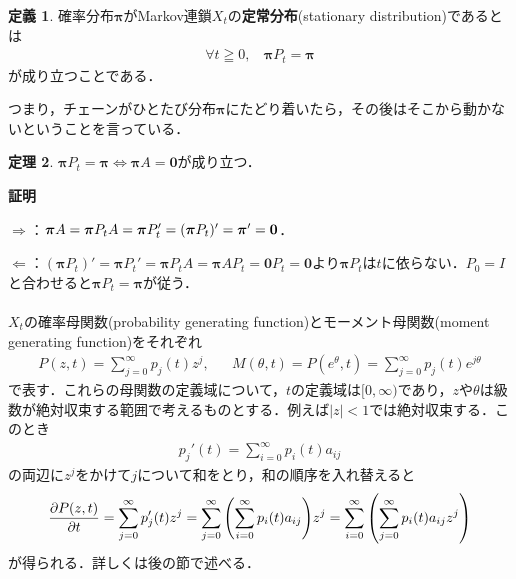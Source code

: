 \documentclass[dvipdfmx]{jsarticle}
\makeatletter
\numberwithin{equation}{section}
\theoremstyle{definition}
\newtheorem{thm}{定理}[section]
\newtheorem{dfn}[thm]{定義}
\renewenvironment{proof}[1][\proofname]{\par
  \pushQED{\qed}%
  \normalfont \topsep6\p@\@plus6\p@\relax
  \trivlist
  \item\relax
  {\bfseries
  #1\@addpunct{.}}\hspace\labelsep\ignorespaces
}{%
  \popQED\endtrivlist\@endpefalse
}
\renewcommand{\proofname}{証明}
\let\d\relax
\newcommand{\d}{\displaystyle}
\newcommand{\bpi}{\bm{\pi}}
\newcommand{\0}{\bm{0}}
\newcommand{\1}{\bm{1}}
\newcommand{\Llr}{\Longleftrightarrow}
\newcommand{\Lr}{\Longrightarrow}
\makeatother
\begin{document}
\begin{dfn}
  確率分布$\bm{\pi}$がMarkov連鎖$X_t$の{\bf 定常分布}(stationary distribution)であるとは
  \begin{align}
    \forall t \geqq 0, ~~~~ \bm{\pi} P_t = \bm{\pi}
  \end{align}  
  が成り立つことである．
\end{dfn}

つまり，チェーンがひとたび分布$\bpi$にたどり着いたら，その後はそこから動かないということを言っている．

\begin{thm}
  $\bm{\pi} P_t=\bm{\pi}\Llr\bm{\pi}A=\0$が成り立つ．
\end{thm}

\begin{proof}
  $\Lr$：$\d \bm{\pi} A = \bm{\pi} P_t A = \bm{\pi} P_t' = (\bm{\pi} P_t)' = \bm{\pi}' = \0$．
  
  $\Longleftarrow$：$(\bm{\pi} P_t)' = \bm{\pi} P_t' = \bm{\pi} P_t A = \bm{\pi} A P_t = \0 P_t = \0$より$\bm{\pi} P_t$は$t$に依らない．$P_0 = I$と合わせると$\bm{\pi} P_t = \bm{\pi}$が従う．
\end{proof}

\paragraph{} $X_t$の確率母関数(probability generating function)とモーメント母関数(moment generating function)をそれぞれ
\begin{align}
  P(z,t) = \sum_{j=0}^{\infty} p_j(t) z^j, && 
  M(\theta, t) = P(e^{\theta}, t) = \sum_{j=0}^{\infty} p_j(t) e^{j \theta}
\end{align}
で表す．これらの母関数の定義域について，$t$の定義域は$[0, \infty)$であり，$z$や$\theta$は級数が絶対収束する範囲で考えるものとする．例えば$|z|<1$では絶対収束する．このとき
\begin{align}
  p_j'(t)=\sum_{i=0}^{\infty}p_i(t)a_{ij}  
\end{align}
の両辺に$z^j$をかけて$j$について和をとり，和の順序を入れ替えると
\begin{gather}\label{eq: gfmethod}
  \pdv{P(z,t)}{t} = \sum_{j=0}^{\infty} p_j'(t) z^j = \sum_{j=0}^{\infty} \qty(\sum_{i=0}^{\infty} p_i(t) a_{ij}) z^j = \sum_{i=0}^{\infty} \qty(\sum_{j=0}^{\infty} p_i(t) a_{ij} z^j)
\end{gather}
が得られる．詳しくは後の節で述べる．
\end{document}
